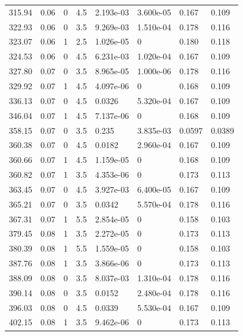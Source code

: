 \documentclass[preview]{standalone}
\begin{document}
{{{\begin{tabular}{L{1.2cm}C{1.2cm} C{0.3cm}C{0.5cm} C{1.4cm}C{1.4cm} C{1.4cm}C{1.4cm}}
  315.94  &  0.06  & 0     & 4.5 &  2.193e-03  & 3.600e-05  & 0.167 &  0.109   \\ 
  322.93  &  0.06  & 0     & 3.5 &  9.269e-03  & 1.510e-04  & 0.178 &  0.116   \\ 
  323.07  &  0.06  & 1     & 2.5 &  1.026e-05  & 0  & 0.180 &  0.118   \\ 
  324.53  &  0.06  & 0     & 4.5 &  6.231e-03  & 1.020e-04  & 0.167 &  0.109   \\ 
  327.80  &  0.07  & 0     & 3.5 &  8.965e-05  & 1.000e-06  & 0.178 &  0.116   \\ 
  329.92  &  0.07  & 1     & 4.5 &  4.097e-06  & 0  & 0.168 &  0.109   \\ 
  336.13  &  0.07  & 0     & 4.5 &  0.0326  & 5.320e-04  & 0.167 &  0.109   \\ 
  346.04  &  0.07  & 1     & 4.5 &  7.137e-06  & 0  & 0.168 &  0.109   \\ 
  358.15  &  0.07  & 0     & 3.5 &  0.235  & 3.835e-03  & 0.0597 &  0.0389   \\ 
  360.38  &  0.07  & 0     & 4.5 &  0.0182  & 2.960e-04  & 0.167 &  0.109   \\ 
  360.66  &  0.07  & 1     & 4.5 &  1.159e-05  & 0  & 0.168 &  0.109   \\ 
  360.82  &  0.07  & 1     & 3.5 &  4.353e-06  & 0  & 0.173 &  0.113   \\ 
  363.45  &  0.07  & 0     & 4.5 &  3.927e-03  & 6.400e-05  & 0.167 &  0.109   \\ 
  365.21  &  0.07  & 0     & 3.5 &  0.0342  & 5.570e-04  & 0.178 &  0.116   \\ 
  367.31  &  0.07  & 1     & 5.5 &  2.854e-05  & 0  & 0.158 &  0.103   \\ 
  379.45  &  0.08  & 1     & 3.5 &  2.272e-05  & 0  & 0.173 &  0.113   \\ 
  380.39  &  0.08  & 1     & 5.5 &  1.559e-05  & 0  & 0.158 &  0.103   \\ 
  387.76  &  0.08  & 1     & 3.5 &  3.866e-06  & 0  & 0.173 &  0.113   \\ 
  388.09  &  0.08  & 0     & 3.5 &  8.037e-03  & 1.310e-04  & 0.178 &  0.116   \\ 
  390.14  &  0.08  & 0     & 3.5 &  0.0152  & 2.480e-04  & 0.178 &  0.116   \\ 
  396.03  &  0.08  & 0     & 4.5 &  0.0339  & 5.530e-04  & 0.167 &  0.109   \\ 
  402.15  &  0.08  & 1     & 3.5 &  9.462e-06  & 0  & 0.173 &  0.113   \\ 

\end{tabular}}}}
\end{document}

